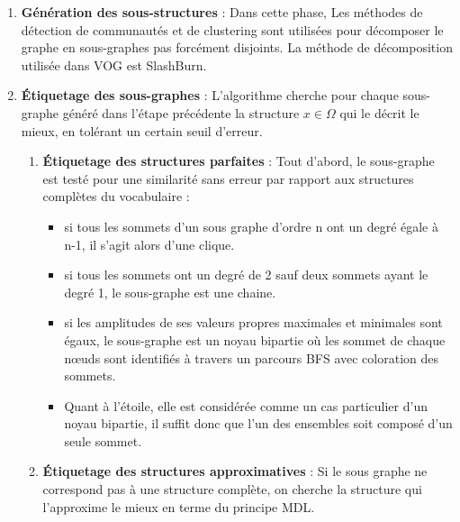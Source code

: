 \begin{enumerate}
 \item \textbf{Génération des sous-structures }: Dans cette phase, Les méthodes de détection de communautés et de clustering sont utilisées pour décomposer le graphe en sous-graphes pas forcément disjoints. La méthode de décomposition utilisée dans VOG est SlashBurn.  
 \item \textbf{Étiquetage des sous-graphes }: L'algorithme cherche pour chaque sous-graphe généré dans l'étape précédente la structure $x \in \Omega$ qui le décrit le mieux, en tolérant un certain seuil d'erreur.
  \begin{enumerate}[label=\alph*]
     \item \textbf{Étiquetage des structures parfaites} : Tout d'abord, le sous-graphe est testé pour une similarité sans erreur par rapport aux structures complètes du vocabulaire :
\begin{itemize}[label=$\circ$]
	\item si tous les sommets d'un sous graphe d'ordre n ont un degré égale à n-1, il s'agit alors d'une clique.
	\item si tous les sommets ont un degré de 2 sauf deux sommets ayant le degré 1, le  sous-graphe est une chaine.
	\item si les amplitudes de ses valeurs propres maximales et minimales sont égaux, le sous-graphe est un noyau bipartie où les sommet de chaque nœuds sont identifiés à travers un parcours BFS avec coloration des sommets.
	\item  Quant à l'étoile, elle est considérée comme un cas particulier d'un noyau bipartie, il suffit donc que l'un des ensembles soit composé d'un seule sommet.
\end{itemize}     
     \item \textbf{Étiquetage des structures approximatives }: Si le sous graphe ne correspond pas à une structure complète, on cherche la structure qui l'approxime le mieux en terme du principe MDL.
     
  \end{enumerate} 
  

\end{enumerate}
